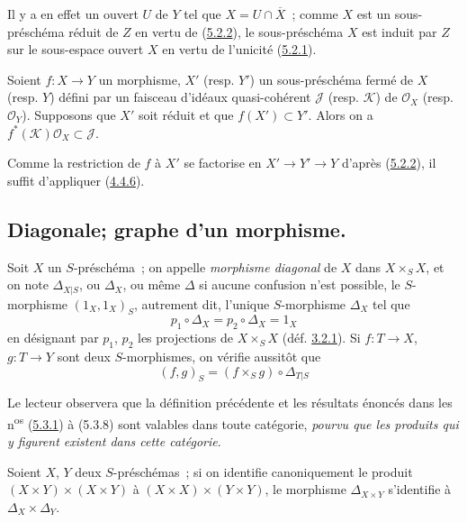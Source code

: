 Il y a en effet un ouvert $U$ de $Y$ tel que
$X=U\cap\overline{X}$~; comme $X$ est un sous-préschéma réduit de $Z$ en
vertu de (\hyperref[I.5.2.2-fr]{5.2.2}), le sous-préschéma $X$ est induit par
$Z$ sur le sous-espace ouvert $X$ en vertu de l'unicité
(\hyperref[I.5.2.1-fr]{5.2.1}).

\begin{corollary}[5.2.4]
\label{I.5.2.4-fr}
Soient $f:X\to Y$ un morphisme, $X'$ (resp. $Y'$) un sous-préschéma fermé de
$X$ (resp. $Y$) défini par un faisceau d'idéaux quasi-cohérent $\mathscr{J}$
(resp. $\mathscr{K}$) de $\mathscr{O}_X$ (resp. $\mathscr{O}_Y$). Supposons
que $X'$ soit réduit et que $f(X')\subset Y'$. Alors on a
$f^*(\mathscr{K})\mathscr{O}_X\subset\mathscr{J}$.
\end{corollary}

Comme la restriction de $f$ à $X'$ se factorise en
$X'\to Y'\to Y$ d'après (\hyperref[I.5.2.2-fr]{5.2.2}), il suffit d'appliquer
(\hyperref[I.4.4.6-fr]{4.4.6}).

\subsection{Diagonale; graphe d'un morphisme.}
\label{subsection:I.5.3-fr}

\begin{env}[5.3.1]
\label{I.5.3.1-fr}
Soit $X$ un $S$-préschéma~; on appelle \emph{morphisme diagonal} de $X$ dans
$X\times_S X$, et on note $\Delta_{X|S}$, ou $\Delta_X$, ou même $\Delta$ si
aucune confusion n'est possible, le $S$-morphisme $(1_X,1_X)_S$, autrement
dit, l'unique $S$-morphisme $\Delta_X$ tel que
\[
  p_1\circ\Delta_X=p_2\circ\Delta_X=1_X
  \tag{5.3.1.1}\label{I.5.3.1.1-fr}
\]
en désignant par $p_1$, $p_2$ les projections de $X\times_S X$
(déf. \hyperref[I.3.2.1-fr]{3.2.1}). Si $f:T\to X$, $g:T\to Y$ sont deux
$S$-morphismes, on vérifie aussitôt que
\[
  (f,g)_S=(f\times_S g)\circ\Delta_{T|S}
  \tag{5.3.1.2}\label{I.5.3.1.2-fr}
\]

Le lecteur observera que la définition précédente et les résultats énoncés
dans les n\textsuperscript{os} (\hyperref[I.5.3.1-fr]{5.3.1}) à (5.3.8) sont
valables dans toute catégorie, \emph{pourvu que les produits qui y figurent
existent dans cette catégorie}.
\end{env}

\begin{proposition}[5.3.2]
\label{I.5.3.2-fr}
Soient $X$, $Y$ deux $S$-préschémas~; si on identifie canoniquement le produit
$(X\times Y)\times(X\times Y)$ à $(X\times X)\times(Y\times Y)$, le morphisme
$\Delta_{X\times Y}$ s'identifie à $\Delta_X\times\Delta_Y$.
\end{proposition}


